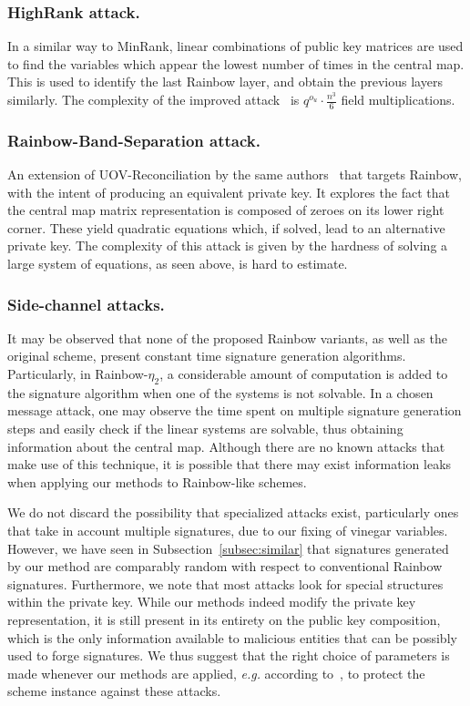 \documentclass[draft, 12pt, a4paper, oneside]{memoir}
\theoremstyle{definition}
\begin{document}
\subsubsection{HighRank attack.} In a similar way to MinRank, linear
combinations of public key matrices are used to find the variables which
appear the lowest number of times in the central map. This is used to identify
the last Rainbow layer, and obtain the previous layers similarly. The
complexity of the improved attack~\cite{Ding:200806} is
$q^{o_{u}} \cdot \frac{n^{3}}{6}$ field multiplications.

\subsubsection{Rainbow-Band-Separation attack.} An extension of
UOV-Reconciliation by the same authors~\cite{Ding:200806} that
targets Rainbow, with the intent of producing an equivalent private key. It
explores the fact that the central map matrix representation is composed of
zeroes on its lower right corner. These yield quadratic equations which, if
solved, lead to an alternative private key. The complexity of this attack is
given by the hardness of solving a large system of equations, as seen
above, is hard to estimate.

\subsubsection{Side-channel attacks.} It may be observed that none of the
proposed Rainbow variants, as well as the original scheme, present constant
time signature generation algorithms. Particularly, in Rainbow-$\eta_2$, a
considerable amount of computation is added to the signature algorithm when one
of the systems is not solvable. In a chosen message attack, one may observe the
time spent on multiple signature generation steps and easily check if the
linear systems are solvable, thus obtaining information about the central map.
Although there are no known attacks that make use of this technique, it is
possible that there may exist information leaks when applying our methods to
Rainbow-like schemes.

We do not discard the possibility that specialized attacks exist,
particularly ones that take in account multiple signatures, due to our fixing
of vinegar variables. However, we have seen in Subsection~\ref{subsec:similar}
that signatures generated by our method are comparably random with respect to
conventional Rainbow signatures. Furthermore, we note that most attacks look
for special structures within the private key. While our methods indeed modify
the private key representation, it is still present in its entirety on the
public key composition, which is the only information available to malicious
entities that can be possibly used to forge signatures. We thus suggest that
the right choice of parameters is made whenever our methods are applied,
\emph{e.g.} according to~\cite{Petzoldt:201005}, to protect the scheme
instance against these attacks.
\end{document}
